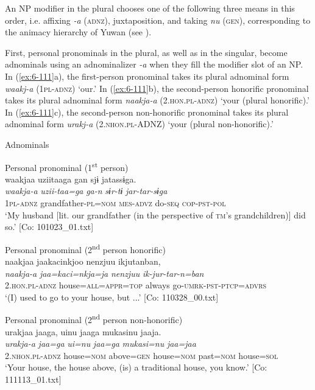 An NP modifier in the plural chooses one of the following three means in this order, i.e. affixing \textit{-a} (\textsc{adnz}), juxtaposition, and taking \textit{nu} (\textsc{gen}), corresponding to the animacy hierarchy of Yuwan (see ).

First, personal pronominals in the plural, as well as in the singular, become adnominals using an adnominalizer \textit{-a} when they fill the modifier slot of an NP. In (\ref{ex:6-111}a), the first-person pronominal takes its plural adnominal form \textit{waakj-a} (1\textsc{pl}-\textsc{adnz}) ‘our.’ In (\ref{ex:6-111}b), the second-person honorific pronominal takes its plural adnominal form \textit{naakja-a} (2.\textsc{hon}.\textsc{pl}-\textsc{adnz}) ‘your (plural honorific).’ In (\ref{ex:6-111}c), the second-person non-honorific pronominal takes its plural adnominal form \textit{urakj-a} (2.\textsc{nhon}.\textsc{pl}-ADNZ) ‘your (plural non-honorific).’

\ea\label{ex:6-111}
  Adnominals

 \ea Personal pronominal (1\textsuperscript{st} person)\\
{\TM}
\glll  waakjaa  uziitaaga  gan  sjɨ    jatassɨga.\\
\textit{waakja-a}  \textit{uzii-taa=ga}  \textit{ga-n}  \textit{sɨr-tɨ} \textit{jar-tar-sɨga}\\
1\textsc{pl}-\textsc{adnz}  grandfather-\textsc{pl}=\textsc{nom}  \textsc{mes}-\textsc{advz}  do-\textsc{seq} \textsc{cop}-\textsc{pst}-\textsc{pol}\\
\glt ‘My husband [lit. our grandfather (in the perspective of \textsc{tm}’s grandchildren)] did so.’ [Co: 101023\_01.txt]
\z

\ex Personal pronominal (2\textsuperscript{nd} person honorific)\\
{\TM}
\glll  naakjaa  jaakacinkjoo  {\textbar}nenzjuu{\textbar} ikjutanban,\\
\textit{naakja-a}  \textit{jaa=kaci=nkja=ja}  \textit{nenzjuu}   \textit{ik-jur-tar-n=ban}\\
2.\textsc{hon}.\textsc{pl}-\textsc{adnz}  house=\textsc{all}=\textsc{appr}=\textsc{top}  always go-\textsc{umrk}-\textsc{pst}-\textsc{ptcp}=\textsc{advrs}\\
\glt ‘(I) used to go to your house, but ...’ [Co: 110328\_00.txt]
\z

\ex Personal pronominal (2\textsuperscript{nd} person non-honorific)\\
{\TM}
\glll  urakjaa  jaaga,  uinu  jaaga      mukasinu  jaaja.\\
\textit{urakja-a}  \textit{jaa=ga}  \textit{ui=nu}  \textit{jaa=ga}  \textit{mukasi=nu}  \textit{jaa=jaa}\\
2.\textsc{nhon}.\textsc{pl}-\textsc{adnz}  house=\textsc{nom}  above=\textsc{gen}  house=\textsc{nom} past=\textsc{nom}  house=\textsc{sol}\\
\glt ‘Your house, the house above, (is) a traditional house, you know.’ [Co: 111113\_01.txt]
\z


